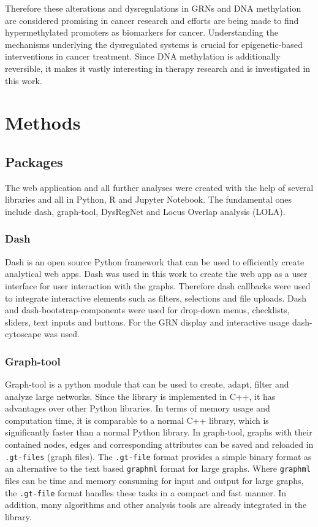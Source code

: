 \documentclass[pdftex,12pt,a4paper]{report}
\begin{document}
Therefore these alterations and dysregulations in GRNs and DNA methylation are considered promising in cancer research and efforts are being made to find hypermethylated promoters as biomarkers for cancer. Understanding the mechanisms underlying the dysregulated systems is crucial for epigenetic-based interventions in cancer treatment. Since DNA methylation is additionally reversible, it makes it vastly interesting in therapy research and is investigated in this work\cite{MethRole}.


\chapter{Methods}
\section{Packages}
The web application and all further analyses were created with the help of several libraries and all in Python, R and Jupyter Notebook. The fundamental ones include dash\cite{dash}, graph-tool\cite{graph-tool}, DysRegNet\cite{dysregnet} and Locus Overlap analysis (LOLA)\cite{LOLA}.

\subsection{Dash}
\label{dash}
Dash is an open source Python framework that can be used to efficiently create analytical web apps. Dash was used in this work to create the web app as a user interface for user interaction with the graphs. Therefore dash callbacks were used to integrate interactive elements such as filters, selections and file uploads. Dash and dash-bootstrap-components were used for drop-down menus, checklists, sliders, text inputs and buttons. For the GRN display and interactive usage dash-cytoscape was used\cite{dash}.


\subsection{Graph-tool}
\label{graphtool}
Graph-tool is a python module that can be used to create, adapt, filter and analyze large networks. Since the library is implemented in C++, it has advantages over other Python libraries. In terms of memory usage and computation time, it is comparable to a normal C++ library, which is significantly faster than a normal Python library. In graph-tool, graphs with their contained nodes, edges and corresponding attributes can be saved and reloaded in \texttt{.gt-files} (graph files). The \texttt{.gt-file} format provides a simple binary format as an alternative to the text based \texttt{graphml} format for large graphs. Where \texttt{graphml} files can be time and memory consuming for input and output for large graphs, the \texttt{.gt-file} format handles these tasks in a compact and fast manner. In addition, many algorithms and other analysis tools are already integrated in the library\cite{graph-tool}.  
\end{document}

